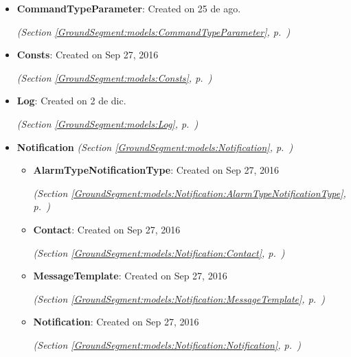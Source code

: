 \begin{itemize}
\item \textbf{CommandTypeParameter}: Created on 25 de ago.



  \textit{(Section \ref{GroundSegment:models:CommandTypeParameter}, p.~\pageref{GroundSegment:models:CommandTypeParameter})}

\item \textbf{Consts}: Created on Sep 27, 2016



  \textit{(Section \ref{GroundSegment:models:Consts}, p.~\pageref{GroundSegment:models:Consts})}

\item \textbf{Log}: Created on 2 de dic.



  \textit{(Section \ref{GroundSegment:models:Log}, p.~\pageref{GroundSegment:models:Log})}

\item \textbf{Notification}
  \textit{(Section \ref{GroundSegment:models:Notification}, p.~\pageref{GroundSegment:models:Notification})}

  \begin{itemize}
\setlength{\parskip}{0ex}
    \item \textbf{AlarmTypeNotificationType}: Created on Sep 27, 2016



  \textit{(Section \ref{GroundSegment:models:Notification:AlarmTypeNotificationType}, p.~\pageref{GroundSegment:models:Notification:AlarmTypeNotificationType})}

    \item \textbf{Contact}: Created on Sep 27, 2016



  \textit{(Section \ref{GroundSegment:models:Notification:Contact}, p.~\pageref{GroundSegment:models:Notification:Contact})}

    \item \textbf{MessageTemplate}: Created on Sep 27, 2016



  \textit{(Section \ref{GroundSegment:models:Notification:MessageTemplate}, p.~\pageref{GroundSegment:models:Notification:MessageTemplate})}

    \item \textbf{Notification}: Created on Sep 27, 2016



  \textit{(Section \ref{GroundSegment:models:Notification:Notification}, p.~\pageref{GroundSegment:models:Notification:Notification})}


\end{itemize}
\end{itemize}
